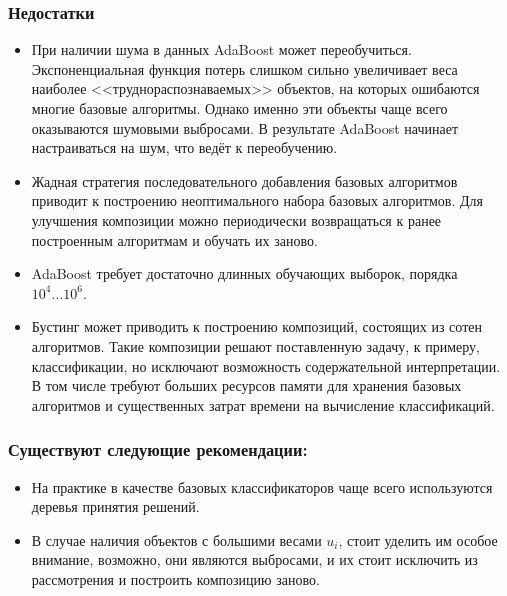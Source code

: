 \documentclass[specialist, 12pt, href]{article}
\begin{document}
\subsubsection*{Недостатки}
 \begin{itemize}

 \item При наличии шума в данных AdaBoost может переобучиться. Экспоненциальная функция потерь слишком сильно увеличивает веса наиболее <<труднораспознаваемых>> объектов, на которых ошибаются многие базовые алгоритмы. Однако именно эти объекты чаще всего оказываются шумовыми выбросами. В результате AdaBoost начинает настраиваться на шум, что ведёт
к переобучению. 

  \item Жадная стратегия последовательного добавления базовых алгоритмов приводит к построению
неоптимального набора базовых алгоритмов. Для улучшения композиции можно периодически возвращаться к ранее построенным алгоритмам и обучать их
заново.

 \item AdaBoost требует достаточно длинных обучающих выборок, порядка $10^4 \ldots 10^6.$
 
 \item Бустинг может приводить к построению композиций, состоящих из сотен алгоритмов. Такие композиции решают поставленную задачу, к примеру, классификации, но исключают возможность содержательной интерпретации. В том числе требуют больших ресурсов памяти для хранения базовых алгоритмов и существенных затрат времени на вычисление классификаций.
  
 \end{itemize}

\subsubsection*{Существуют следующие рекомендации:}

\begin{itemize}

  \item На практике в качестве базовых классификаторов чаще всего используются деревья принятия решений. 
  
  \item В случае наличия объектов с большими весами $u_i$, стоит уделить им особое внимание, возможно, они являются выбросами, и их стоит исключить из рассмотрения и построить композицию заново.
  
 \end{itemize}
\end{document}
